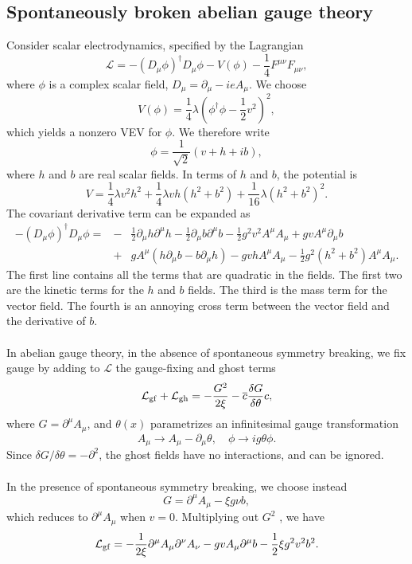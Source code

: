 \subsection{Spontaneously broken abelian gauge theory}
Consider scalar electrodynamics, specified by the Lagrangian
\[\mathcal{L} = -(D_{\mu}\phi)^{\dagger}D_{\mu}\phi - V(\phi) - \frac{1}{4}F^{\mu\nu}F_{\mu\nu},\]
where $\phi$ is a complex scalar field, $D_{\mu} = \partial_{\mu} - ieA_{\mu}$. We choose
\[V(\phi) = \frac{1}{4}\lambda (\phi^{\dagger}\phi - \frac{1}{2}v^2)^2,\]
which yields a nonzero VEV for $\phi$. We therefore write
\[\phi = \frac{1}{\sqrt{2}}(v + h + ib),\]
where $h$ and $b$ are real scalar fields. In terms of $h$ and $b$, the potential is
\[V = \frac{1}{4}\lambda v^2 h^2 + \frac{1}{4}\lambda vh(h^2+b^2) + \frac{1}{16}\lambda (h^2+b^2)^2.\]
The covariant derivative term can be expanded as
\begin{eqnarray}
-(D_{\mu}\phi)^{\dagger}D_{\mu}\phi = &-& \frac{1}{2}\partial_{\mu}h \partial^{\mu}h -  \frac{1}{2}\partial_{\mu}b \partial^{\mu}b - \frac{1}{2} g^2v^2A^{\mu}A_{\mu} + gv A^{\mu}\partial_{\mu}b \nonumber \\
&+& gA^{\mu} (h\partial_{\mu}b - b\partial_{\mu}h) - gvhA^{\mu}A_{\mu} - \frac{1}{2}g^2(h^2+b^2)A^{\mu}A_{\mu} .\nonumber
\end{eqnarray}
The first line contains all the terms that are quadratic in the fields. The first two are the kinetic terms for the $h$ and $b$ fields. The third is the mass term for the vector field. The fourth is an annoying cross term between the vector field and the derivative of $b$.
\\ \\
In abelian gauge theory, in the absence of spontaneous symmetry breaking, we fix gauge by adding to $\mathcal{L}$ the gauge-fixing and ghost terms
\[\mathcal{L}_{\rm gf} + \mathcal{L}_{\rm gh} = - \frac{G^2}{2\xi} - \overline{c}\frac{\delta G}{\delta \theta} c ,\]
where $G = \partial^{\mu}A_{\mu}$, and $\theta(x)$ parametrizes an infinitesimal gauge transformation
\[A_{\mu} \to A_{\mu} - \partial_{\mu}\theta , \quad \phi \to ig\theta\phi.\]
Since $\delta G / \delta \theta = - \partial^2$, the ghost fields have no interactions, and can be ignored.
\\ \\
In the presence of spontaneous symmetry breaking, we choose instead
\[G = \partial^{\mu}A_{\mu} - \xi g\nu b,\]
which reduces to $\partial^{\mu}A_{\mu}$ when $v = 0$. Multiplying out $G^2$ , we have
\[\mathcal{L}_{\rm gf} = -\frac{1}{2\xi} \partial^{\mu}A_{\mu} \partial^{\nu}A_{\nu} - gvA_{\mu}\partial^{\mu}b - \frac{1}{2}\xi g^2v^2b^2.\]

